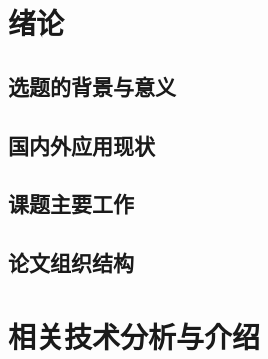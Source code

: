 \documentclass{ecnuthesis}
\begin{document}
    \frontmatter

    \begin{abstract}
    \end{abstract}

    \begin{abstractEN}
    \end{abstractEN}

    \mainmatter


    \chapter{绪论}\label{ch:intro}


    \section{选题的背景与意义}\label{sec:background}


    \section{国内外应用现状}\label{sec:status}


    \section{课题主要工作}\label{sec:work}


    \section{论文组织结构}\label{sec:structure}


    \chapter{相关技术分析与介绍}\label{ch:tech}
\end{document}

